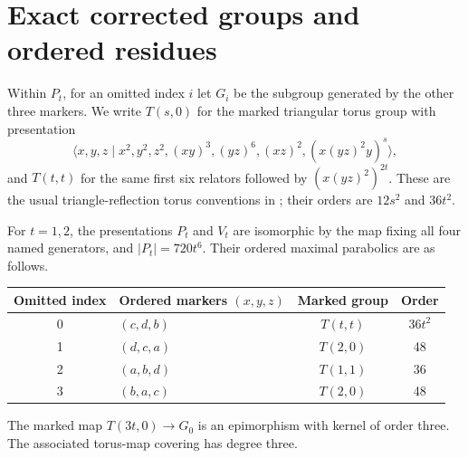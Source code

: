 \section{Exact corrected groups and ordered residues}
Within $P_t$, for an omitted index $i$ let $G_i$ be the subgroup generated by the
other three markers. We write $T(s,0)$ for the marked triangular torus
group with presentation
\[
 \langle x,y,z\mid x^2,y^2,z^2,(xy)^3,(yz)^6,(xz)^2,
                    (x(yz)^2y)^s\rangle,
\]
and $T(t,t)$ for the same first six relators followed by
$(x(yz)^2)^{2t}$. These are the usual triangle-reflection torus
conventions in \cite{source}; their orders are $12s^2$ and $36t^2$.
\begin{theorem}\label{thm:finite}
For $t=1,2$, the presentations $P_t$ and $V_t$ are isomorphic by
the map fixing all four named generators, and $|P_t|=720t^6$.
Their ordered maximal parabolics are as follows.
\begin{center}
\begin{tabular}{clcc}\toprule
Omitted index&Ordered markers $(x,y,z)$&Marked group&Order\\\midrule
0&$(c,d,b)$&$T(t,t)$&$36t^2$\\
1&$(d,c,a)$&$T(2,0)$&48\\
2&$(a,b,d)$&$T(1,1)$&36\\
3&$(b,a,c)$&$T(2,0)$&48\\\bottomrule
\end{tabular}
\end{center}
The marked map $T(3t,0)\longrightarrow G_0$ is an epimorphism
with kernel of order three. The associated torus-map covering has
degree three.
\end{theorem}
